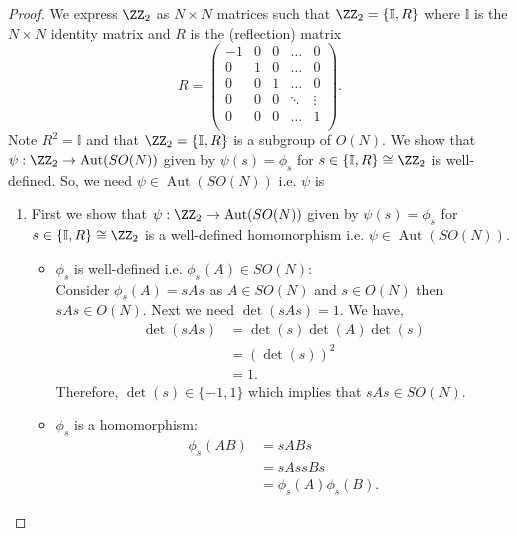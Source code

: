 \documentclass[12pt, a4paper]{article}
\DeclareMathOperator{\aut}{Aut}
\begin{document}
\begin{proof}
    We express \(\ZZ_2\) as \(N \times N\) matrices such that \(\ZZ_2=\{\mathbb{I},R\}\) where \(\mathbb{I}\) is the \(N \times N\) identity matrix and \(R\) is the (reflection) matrix 
    \[R = \begin{pmatrix}
        -1 & 0 & 0 & \ldots & 0 \\
        0 & 1 & 0 & \ldots & 0 \\
        0 & 0 & 1 & \ldots & 0 \\
        0 & 0 & 0 & \ddots & \vdots \\
        0 & 0 & 0 & \ldots & 1 \\
    \end{pmatrix}.\]
    Note \(R^2=\mathbb{I}\) and that \(\ZZ_2=\{\mathbb{I}, R\}\) is a subgroup of \(O(N)\).
    We show that \(\psi : \ZZ_2 \to \aut(SO(N))\) given by \(\psi(s) = \phi_s\) for \(s \in \{\mathbb{I},R\} \cong \ZZ_2\) is well-defined. So, we need \(\psi \in \aut(SO(N))\) i.e. \(\psi\) is 
    \begin{enumerate}
        \item First we show that \(\psi : \ZZ_2 \to \aut(SO(N))\) given by \(\psi(s) = \phi_s\) for \(s \in \{\mathbb{I},R\}\cong \ZZ_2\) is a well-defined homomorphism i.e. \(\psi \in \aut(SO(N))\).
        \begin{itemize}
            \item \(\phi_s\) is well-defined i.e. \(\phi_s(A) \in SO(N)\): \\
                    Consider \(\phi_s(A)=sAs\) as \(A \in SO(N)\) and \(s\in O(N)\) then \(sAs \in O(N)\). Next we need \(\det(sAs)=1\). We have,
                    \[\begin{aligned}
                        \det(sAs) &= \det(s)\det(A)\det(s) \\
                                &= (\det(s))^2 \\
                                &=1.
                    \end{aligned}\]
                    Therefore, \(\det(s) \in \{-1,1\}\) which implies that \(sAs \in SO(N)\).
            \item \(\phi_s\) is a homomorphism:
                    \[\begin{aligned}
                        \phi_s(AB) &= sABs \\
                                    &= sAssBs \\
                                    &= \phi_s(A)\phi_s(B).
                    \end{aligned}\]

\end{itemize}
\end{enumerate}
\end{proof}
\end{document}
